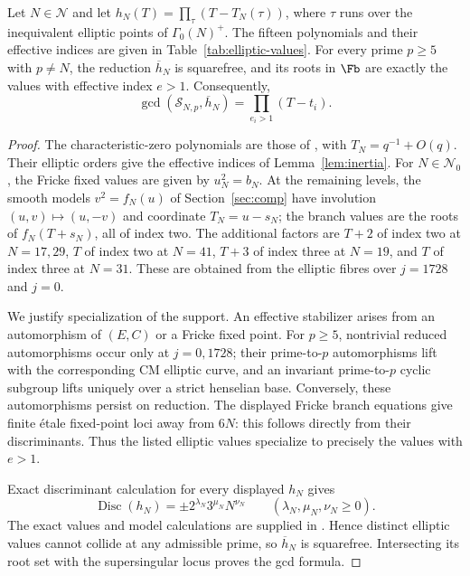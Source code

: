 \begin{lemma}\label{lem:elliptic-specialization}
Let $N\in\mathcal N$ and let
$h_N(T)=\prod_{\tau}(T-T_N(\tau))$, where $\tau$ runs over the
inequivalent elliptic points of $\Gamma_0(N)^+$.
The fifteen polynomials and their effective indices are given in
Table~\ref{tab:elliptic-values}.
For every prime $p\ge5$ with $p\ne N$, the reduction
$\overline h_N$ is squarefree, and its roots in $\Fb$ are exactly the
values with effective index $e>1$. Consequently,
\[
\gcd(\mathcal S_{N,p},\overline h_N)=\prod_{e_i>1}(T-t_i).
\]
\end{lemma}
\begin{proof}
The characteristic-zero polynomials are those of
\citet[\S4.2, Table~1]{JST19}, with $T_N=q^{-1}+O(q)$.
Their elliptic orders give the effective indices of
Lemma~\ref{lem:inertia}. For $N\in\mathcal N_0$, the Fricke fixed values
are given by $u_N^2=b_N$. At the remaining levels, the smooth models
$v^2=f_N(u)$ of Section~\ref{sec:comp} have involution
$(u,v)\mapsto(u,-v)$ and coordinate $T_N=u-s_N$;
the branch values are the roots of $f_N(T+s_N)$, all of index two.
The additional factors are $T+2$ of index two at $N=17,29$,
$T$ of index two at $N=41$, $T+3$ of index three at $N=19$,
and $T$ of index three at $N=31$. These are obtained from the
elliptic fibres over $j=1728$ and $j=0$.

We justify specialization of the support. An effective stabilizer arises
from an automorphism of $(E,C)$ or a Fricke fixed point. For $p\ge5$,
nontrivial reduced automorphisms occur only at $j=0,1728$; their
prime-to-$p$ automorphisms lift with the corresponding CM elliptic curve,
and an invariant prime-to-$p$ cyclic subgroup lifts uniquely over a
strict henselian base. Conversely, these automorphisms persist on reduction.
The displayed Fricke branch equations give finite \'etale fixed-point
loci away from $6N$: this follows directly from their discriminants.
Thus the listed elliptic values specialize to precisely the values with
$e>1$.

Exact discriminant calculation for every displayed $h_N$ gives
\[
\operatorname{Disc}(h_N)=\pm2^{\lambda_N}3^{\mu_N}N^{\nu_N}
\qquad(\lambda_N,\mu_N,\nu_N\ge0).
\]
The exact values and model calculations are supplied in
.
Hence distinct elliptic values cannot collide at any admissible prime,
so $\overline h_N$ is squarefree. Intersecting its root set with the
supersingular locus proves the gcd formula.
\end{proof}

